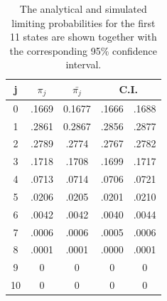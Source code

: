 \begin{table}[!htbp]
\centering
\begin{tabular}{ccccc}
  \hline
  \noalign{\smallskip}
  j & $\pi_j$ & $\bar{\pi_j}$ & \multicolumn{2}{c|}{C.I.} \\
  \hline
  \noalign{\smallskip}
  0   & .1669 & 0.1677 & .1666  & .1688  \\
  1   & .2861 & 0.2867 & .2856  & .2877  \\
  2   & .2789  & .2774 & .2767  & .2782  \\
  3   & .1718  & .1708 & .1699  & .1717  \\
  4   & .0713  & .0714 & .0706  & .0721  \\
  5   & .0206  & .0205 & .0201  & .0210  \\
  6   & .0042  & .0042 & .0040  & .0044  \\
  7   & .0006  & .0006 & .0005  & .0006  \\
  8   & .0001  & .0001 & .0000  & .0001  \\
  9   &   0    &   0   &    0   &   0    \\
  10  &   0    &   0   &    0   &   0    \\
\hline
\end{tabular}
\caption{The analytical and simulated limiting probabilities for the first 11 states are shown together with the corresponding 95\% confidence interval.}
\label{lim_p}
\end{table}



